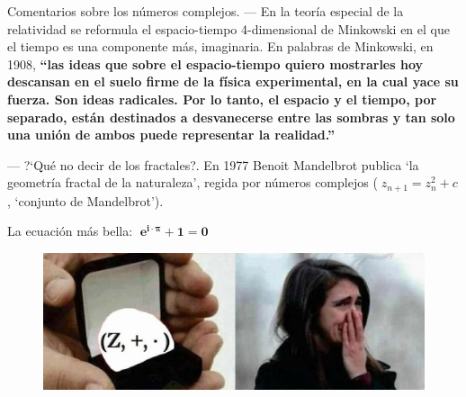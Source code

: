\begin{myexampleblock}{Comentarios sobre los números complejos.}
\vspace{2mm}
\small{--- En la teoría especial de la relatividad se reformula el espacio-tiempo 4-dimensional de Minkowski en el que el tiempo es una componente más, imaginaria. En palabras de Minkowski, en 1908, \textbf{``las ideas que sobre el espacio-tiempo quiero mostrarles hoy descansan en el suelo firme de la física experimental, en la cual yace su fuerza. Son ideas radicales. Por lo tanto, el espacio y el tiempo, por separado, están destinados a desvanecerse entre las sombras y tan solo una unión de ambos puede representar la realidad.''}}


\vspace{2mm}
\small{--- ?`Qué no decir de los fractales?. En 1977 Benoit Mandelbrot publica `la geometría fractal de la naturaleza', regida por números complejos ($\; z_{n+1}=z_n^2+c$, `conjunto de Mandelbrot').}


\vspace{2mm}
\centerline{La ecuación más bella:    $\boxed{\;\boldsymbol{ e^ {i\cdot \pi}  + 1 = 0} \;} $}

\end{myexampleblock}

\vspace{5mm}
	\begin{figure}[H]
		\centering
		\includegraphics[width=1\textwidth]{imagenes/imagenes01/T01IM07.png}
	\end{figure}




		
%
%



